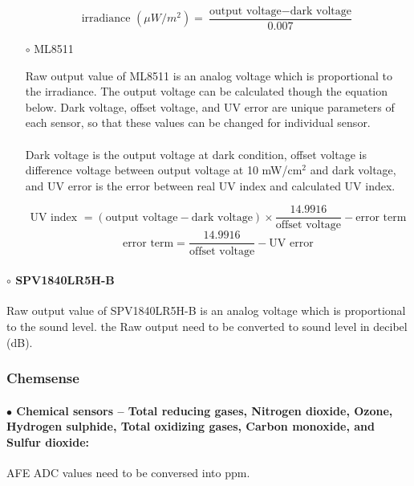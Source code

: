 \begin{itemize}
\bigbreak

{\centering
 \[ \text{irradiance } (\mu W/m^2) = \frac{\text{output voltage} - \text{dark voltage}}{0.007} \]
 \par
 }
 

\item[$\circ$] ML8511

Raw output value of ML8511 is an analog voltage which is proportional to the irradiance. The output voltage can be calculated though the equation below.
Dark voltage, offset voltage, and UV error are unique parameters of each sensor, so that these values can be changed for individual sensor.
\\\\
Dark voltage is the output voltage at dark condition, offset voltage is difference voltage between output voltage at 10 mW/cm$^2$ and dark voltage,
and UV error is the error between real UV index and calculated UV index.

\bigbreak

{\centering
 \[ \text{UV index } = \left( \text{output voltage} - \text{dark voltage} \right) \times \frac{14.9916}{\text{offset voltage}} - \text{error term}\]
 \[ \text{error term} = \frac{14.9916}{\text{offset voltage}} - \text{UV error} \]
 \par
 }
 
\end{itemize}

\paragraph{$\circ$ SPV1840LR5H-B}

Raw output value of SPV1840LR5H-B is an analog voltage which is proportional to the sound level.
the Raw output need to be converted to sound level in decibel (dB).
 


\subsubsection{Chemsense}

\paragraph{$\bullet$ Chemical sensors -- Total reducing gases, Nitrogen dioxide, Ozone, Hydrogen sulphide, Total oxidizing gases, Carbon monoxide, and Sulfur dioxide:}
AFE ADC values need to be conversed into ppm.


